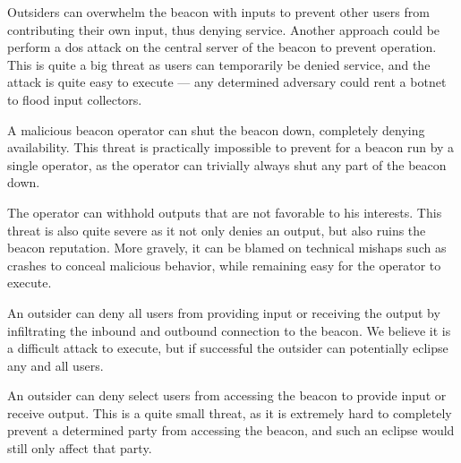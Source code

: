 Outsiders can overwhelm the beacon with inputs to prevent other users from contributing their own input, thus denying service.
Another approach could be perform a \gls{dos} attack on the central server of the beacon to prevent operation.
This is quite a big threat as users can temporarily be denied service, and the attack is quite easy to execute --- any determined adversary could rent a botnet to flood input collectors.

A malicious beacon operator can shut the beacon down, completely denying availability.
This threat is practically impossible to prevent for a beacon run by a single operator, as the operator can trivially always shut any part of the beacon down.

The operator can withhold outputs that are not favorable to his interests.
This threat is also quite severe as it not only denies an output, but also ruins the beacon reputation.
More gravely, it can be blamed on technical mishaps such as crashes to conceal malicious behavior, while remaining easy for the operator to execute.

An outsider can deny all users from providing input or receiving the output by infiltrating the inbound and outbound connection to the beacon.
We believe it is a difficult attack to execute, but if successful the outsider can potentially eclipse any and all users.

An outsider can deny select users from accessing the beacon to provide input or receive output.
This is a quite small threat, as it is extremely hard to completely prevent a determined party from accessing the beacon, and such an eclipse would still only affect that party.

